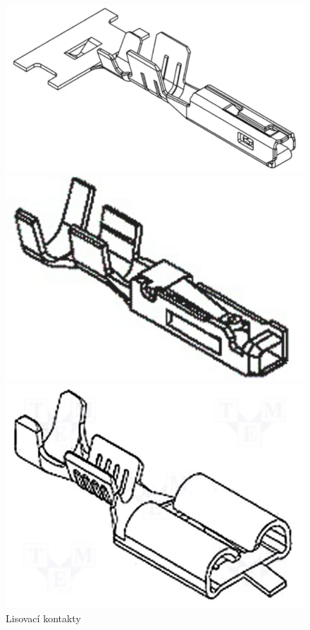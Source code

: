 \documentclass{article}
\begin{document}
\begin{figure}[H]
  \begin{minipage}[t]{0.34\textwidth}
    \centering
    \includegraphics[width=\textwidth]{lisovacka1.png}
  \end{minipage}
  \hfil
  \begin{minipage}[t]{0.32\textwidth}
    \includegraphics[width=\textwidth]{lisovacka2.png}
    \centering
  \end{minipage}
  \hfil
  \begin{minipage}[t]{0.32\textwidth}
    \includegraphics[width=\textwidth]{lisovacka3.png}
    \centering
  \end{minipage}
  \caption{Lisovací kontakty}
\end{figure}
\end{document}
